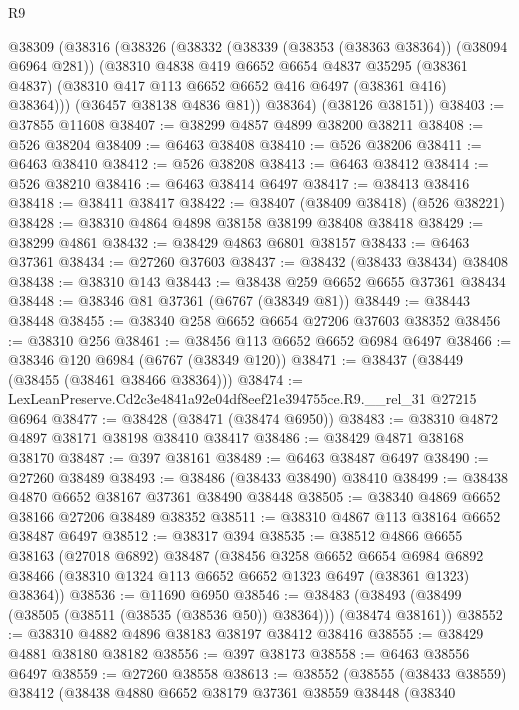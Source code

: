 \begin{lexlean}{R9}
\begin{coremodule}
    @38309
      (@38316
        (@38326
          (@38332
            (@38339 (@38353 (@38363 @38364)) (@38094 @6964 @281))
            (@38310
              @4838
              @419
              @6652
              @6654
              @4837
              @35295
              (@38361 @4837)
              (@38310 @417 @113 @6652 @6652 @416 @6497 (@38361 @416) @38364)))
          (@36457 @38138 @4836 @81))
        @38364)
      (@38126 @38151))
@38403 := @37855 @11608
@38407 := @38299 @4857 @4899 @38200 @38211
@38408 := @526 @38204
@38409 := @6463 @38408
@38410 := @526 @38206
@38411 := @6463 @38410
@38412 := @526 @38208
@38413 := @6463 @38412
@38414 := @526 @38210
@38416 := @6463 @38414 @6497
@38417 := @38413 @38416
@38418 := @38411 @38417
@38422 := @38407 (@38409 @38418) (@526 @38221)
@38428 := @38310 @4864 @4898 @38158 @38199 @38408 @38418
@38429 := @38299 @4861
@38432 := @38429 @4863 @6801 @38157
@38433 := @6463 @37361
@38434 := @27260 @37603
@38437 := @38432 (@38433 @38434) @38408
@38438 := @38310 @143
@38443 := @38438 @259 @6652 @6655 @37361 @38434
@38448 := @38346 @81 @37361 (@6767 (@38349 @81))
@38449 := @38443 @38448
@38455 := @38340 @258 @6652 @6654 @27206 @37603 @38352
@38456 := @38310 @256
@38461 := @38456 @113 @6652 @6652 @6984 @6497
@38466 := @38346 @120 @6984 (@6767 (@38349 @120))
@38471 := @38437 (@38449 (@38455 (@38461 @38466 @38364)))
@38474 := LexLeanPreserve.Cd2c3e4841a92e04df8eef21e394755ce.R9.__rel_31 @27215 @6964
@38477 := @38428 (@38471 (@38474 @6950))
@38483 := @38310 @4872 @4897 @38171 @38198 @38410 @38417
@38486 := @38429 @4871 @38168 @38170
@38487 := @397 @38161
@38489 := @6463 @38487 @6497
@38490 := @27260 @38489
@38493 := @38486 (@38433 @38490) @38410
@38499 := @38438 @4870 @6652 @38167 @37361 @38490 @38448
@38505 := @38340 @4869 @6652 @38166 @27206 @38489 @38352
@38511 := @38310 @4867 @113 @38164 @6652 @38487 @6497
@38512 := @38317 @394
@38535 := @38512
    @4866
    @6655
    @38163
    (@27018 @6892)
    @38487
    (@38456
      @3258
      @6652
      @6654
      @6984
      @6892
      @38466
      (@38310 @1324 @113 @6652 @6652 @1323 @6497 (@38361 @1323) @38364))
@38536 := @11690 @6950
@38546 := @38483 (@38493 (@38499 (@38505 (@38511 (@38535 (@38536 @50)) @38364))) (@38474 @38161))
@38552 := @38310 @4882 @4896 @38183 @38197 @38412 @38416
@38555 := @38429 @4881 @38180 @38182
@38556 := @397 @38173
@38558 := @6463 @38556 @6497
@38559 := @27260 @38558
@38613 := @38552
    (@38555
      (@38433 @38559)
      @38412
      (@38438
        @4880
        @6652
        @38179
        @37361
        @38559
        @38448
        (@38340

\end{coremodule}
\end{lexlean}
